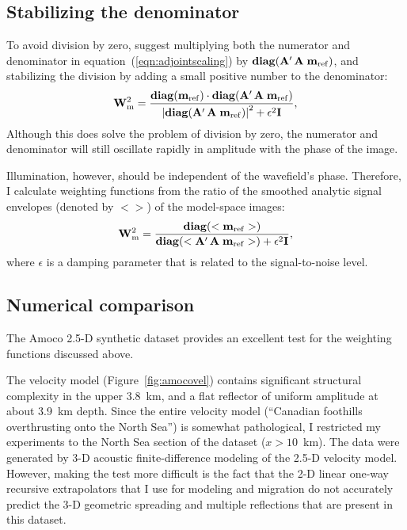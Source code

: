 \subsection{Stabilizing the denominator}
To avoid division by zero,  suggest
multiplying both the numerator and denominator in  
equation~(\ref{eqn:adjointscaling}) by 
${\rm\bf diag} ({\bf A}'\, {\bf A} \; {\bf m}_{\rm ref})$, and
stabilizing the division by adding a small positive number to the
denominator:
\begin{equation}
{\bf W}_{\rm m}^{2} = \frac{ {\rm\bf diag} ( {\bf m}_{\rm ref} ) 
\cdot {\rm\bf diag} ({\bf A}'\, {\bf A} \; {\bf m}_{\rm ref})}
{ \left| {\rm\bf diag} ( {\bf A}'\,  {\bf A} \; {\bf m}_{\rm ref}) 
\right|^2 + \epsilon^2 {\bf I}}, 
\end{equation}
Although this does solve the problem of division by zero, the
numerator and denominator will still oscillate rapidly in amplitude
with the phase of the image.

\par
Illumination, however, should be independent of the wavefield's
phase. Therefore, I calculate weighting functions from the ratio of
the smoothed analytic signal envelopes (denoted by $<>$) of the
model-space images:  
\begin{equation} \label{eqn:adjointscaling2}
{\bf W}_{\rm m}^{2} = \frac{ {\rm\bf diag} ( <{\bf m}_{\rm ref}> ) }
{ {\rm\bf diag} ( <{\bf A}'\,  {\bf A} \; {\bf m}_{\rm ref}>) + 
\epsilon^2 {\bf I}}, 
\end{equation}
where $\epsilon$ is a damping parameter that is related to the 
signal-to-noise level.


\subsection{Numerical comparison}

The Amoco 2.5-D synthetic dataset \cite{amoco25d}
provides an excellent test for the weighting functions discussed
above.  

\par
The velocity model (Figure~\ref{fig:amocovel}) contains
significant structural complexity in the upper 3.8~km, and a flat
reflector of uniform amplitude at about 3.9~km depth.  
Since the entire velocity model (``Canadian foothills overthrusting 
onto the North Sea'') is somewhat pathological, I restricted my
experiments to the North Sea section of the dataset ($x>10$~km).
The data were generated by 3-D acoustic finite-difference modeling of
the 2.5-D velocity model.   
However, making the test more difficult is the fact that the 2-D
linear one-way recursive extrapolators \cite{ristow94} that I use for 
modeling and migration do not accurately predict the 3-D geometric
spreading and multiple reflections that are present in this dataset.

